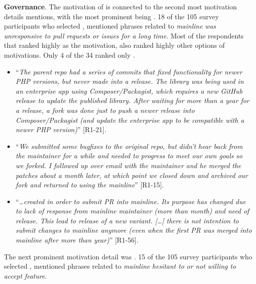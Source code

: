 \nd \textbf{Governance}. The motivation of  is connected to the second most motivation details mentions, with the most prominent being . 18 of the 105 survey participants who selected , mentioned phrases related to \emph{mainline was unresponsive to pull requests or issues for a long time}. Most of the respondents that ranked highly  as the motivation, also ranked highly other options of motivations. Only 4 of the 34 ranked only . 

\begin{itemize}[leftmargin=*]
\item ``\emph{The parent repo had a series of commits that fixed functionality for newer PHP versions, but never made into a release. The library was being used in an enterprise app using Composer/Packagist, which requires a new GitHub release to update the published library. After waiting for more than a year for a release, a fork was done just to push a newer release into Composer/Packagist (and update the enterprise app to be compatible with a newer PHP version)}'' [R1-21].

\item ``\emph{We submitted some bugfixes to the original repo, but didn't hear back from the maintainer for a while and needed to progress to meet our own goals so we forked. I followed up over email with the maintainer and he merged the patches about a month later, at which point we closed down and archived our fork and returned to using the mainline}'' [R1-15].

\item ``\emph{\ldots created in order to submit PR into mainline. Its purpose has changed due to lack of response from mainline maintainer (more than month) and need of release. This lead to release of a new variant. [\ldots] there is not intention to submit changes to mainline anymore (even when the first PR was merged into mainline after more than year)}'' [R1-56].
\end{itemize}

\nd The next prominent  motivation detail was .
15 of the 105 survey participants who selected , mentioned phrases related to \emph{mainline hesitant to or not willing to accept feature}.


